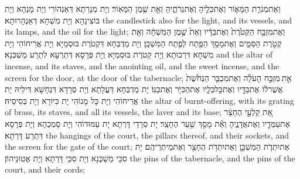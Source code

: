 {וְאֶת\maqqaf מְנֹרַ֧ת הַמָּא֛וֹר וְאֶת\maqqaf כֵּלֶ֖יהָ וְאֶת\maqqaf נֵרֹתֶ֑יהָ וְאֵ֖ת שֶׁ֥מֶן הַמָּאֽוֹר׃}
{וְיָת מְנָרְתָא דְּאַנְהוֹרִי וְיָת מָנַהָא וְיָת בּוֹצִינַהָא וְיָת מִשְׁחָא דְּאַנְהָרוּתָא׃}
{the candlestick also for the light, and its vessels, and its lamps, and the oil for the light;}{}
{וְאֶת\maqqaf מִזְבַּ֤ח הַקְּטֹ֙רֶת֙ וְאֶת\maqqaf בַּדָּ֔יו וְאֵת֙ שֶׁ֣מֶן הַמִּשְׁחָ֔ה וְאֵ֖ת קְטֹ֣רֶת הַסַּמִּ֑ים וְאֶת\maqqaf מָסַ֥ךְ הַפֶּ֖תַח לְפֶ֥תַח הַמִּשְׁכָּֽן׃}
{וְיָת מַדְבְּחָא דִּקְטֹרֶת בּוּסְמַיָּא וְיָת אֲרִיחוֹהִי וְיָת מִשְׁחָא דִּרְבוּתָא וְיָת קְטֹרֶת בּוּסְמַיָּא וְיָת פְּרָסָא דְּתַרְעָא לִתְרַע מַשְׁכְּנָא׃}
{and the altar of incense, and its staves, and the anointing oil, and the sweet incense, and the screen for the door, at the door of the tabernacle;}{}
{אֵ֣ת \legarmeh  מִזְבַּ֣ח הָעֹלָ֗ה וְאֶת\maqqaf מִכְבַּ֤ר הַנְּחֹ֙שֶׁת֙ אֲשֶׁר\maqqaf ל֔וֹ אֶת\maqqaf בַּדָּ֖יו וְאֶת\maqqaf כׇּל\maqqaf כֵּלָ֑יו אֶת\maqqaf הַכִּיֹּ֖ר וְאֶת\maqqaf כַּנּֽוֹ׃}
{יָת מַדְבְּחָא דַּעֲלָתָא וְיָת סְרָדָא דִּנְחָשָׁא דִּילֵיהּ יָת אֲרִיחוֹהִי וְיָת כָּל מָנוֹהִי יָת כִּיּוֹרָא וְיָת בְּסִיסֵיהּ׃}
{the altar of burnt-offering, with its grating of brass, its staves, and all its vessels, the laver and its base;}{}
{אֵ֚ת קַלְעֵ֣י הֶחָצֵ֔ר אֶת\maqqaf עַמֻּדָ֖יו וְאֶת\maqqaf אֲדָנֶ֑יהָ וְאֵ֕ת מָסַ֖ךְ שַׁ֥עַר הֶחָצֵֽר׃}
{יָת סְרָדֵי דָּרְתָא יָת עַמּוּדוֹהִי וְיָת סָמְכַהָא וְיָת פְּרָסָא דִּתְרַע דָּרְתָא׃}
{the hangings of the court, the pillars thereof, and their sockets, and the screen for the gate of the court;}{}
{אֶת\maqqaf יִתְדֹ֧ת הַמִּשְׁכָּ֛ן וְאֶת\maqqaf יִתְדֹ֥ת הֶחָצֵ֖ר וְאֶת\maqqaf מֵיתְרֵיהֶֽם׃}
{יָת סִכֵּי מַשְׁכְּנָא וְיָת סִכֵּי דָּרְתָא וְיָת אֲטוּנֵיהוֹן׃}
{the pins of the tabernacle, and the pins of the court, and their cords;}{}
